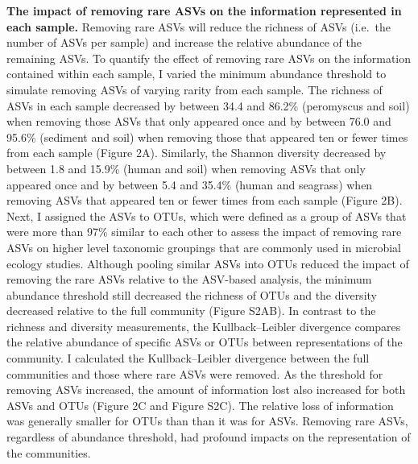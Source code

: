 \documentclass[]{article}
\begin{document}
\textbf{The impact of removing rare ASVs on the information represented
in each sample.} Removing rare ASVs will reduce the richness of ASVs
(i.e.~the number of ASVs per sample) and increase the relative abundance
of the remaining ASVs. To quantify the effect of removing rare ASVs on
the information contained within each sample, I varied the minimum
abundance threshold to simulate removing ASVs of varying rarity from
each sample. The richness of ASVs in each sample decreased by between
34.4 and 86.2\% (peromyscus and soil) when removing those ASVs that only
appeared once and by between 76.0 and 95.6\% (sediment and soil) when
removing those that appeared ten or fewer times from each sample (Figure
2A). Similarly, the Shannon diversity decreased by between 1.8 and
15.9\% (human and soil) when removing ASVs that only appeared once and
by between 5.4 and 35.4\% (human and seagrass) when removing ASVs that
appeared ten or fewer times from each sample (Figure 2B). Next, I
assigned the ASVs to OTUs, which were defined as a group of ASVs that
were more than 97\% similar to each other to assess the impact of
removing rare ASVs on higher level taxonomic groupings that are commonly
used in microbial ecology studies. Although pooling similar ASVs into
OTUs reduced the impact of removing the rare ASVs relative to the
ASV-based analysis, the minimum abundance threshold still decreased the
richness of OTUs and the diversity decreased relative to the full
community (Figure S2AB). In contrast to the richness and diversity
measurements, the Kullback--Leibler divergence compares the relative
abundance of specific ASVs or OTUs between representations of the
community. I calculated the Kullback--Leibler divergence between the
full communities and those where rare ASVs were removed. As the
threshold for removing ASVs increased, the amount of information lost
also increased for both ASVs and OTUs (Figure 2C and Figure S2C). The
relative loss of information was generally smaller for OTUs than than it
was for ASVs. Removing rare ASVs, regardless of abundance threshold, had
profound impacts on the representation of the communities.
\end{document}
